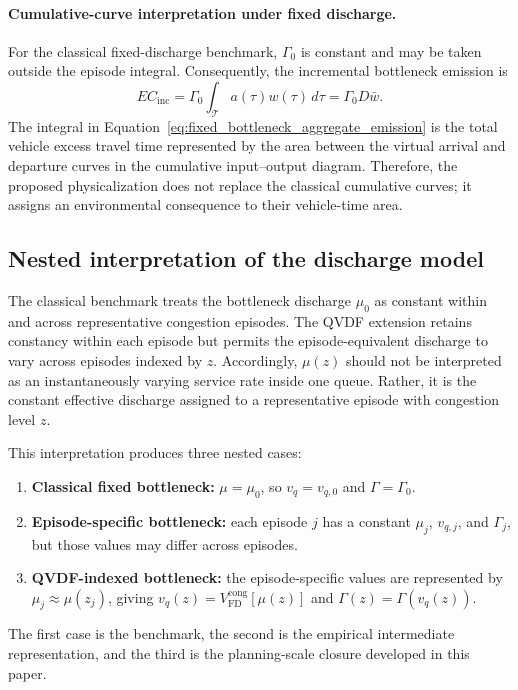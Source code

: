 \paragraph{Cumulative-curve interpretation under fixed discharge.}
For the classical fixed-discharge benchmark, $\Gamma_0$ is constant and may
be taken outside the episode integral. Consequently, the incremental
bottleneck emission is
\begin{equation}
\label{eq:fixed_bottleneck_aggregate_emission}
EC_{\mathrm{inc}}
=
\Gamma_0
\int_{\mathcal T}
a(\tau)w(\tau)\,d\tau
=
\Gamma_0 D\bar w.
\end{equation}
The integral in Equation~\eqref{eq:fixed_bottleneck_aggregate_emission} is the
total vehicle excess travel time represented by the area between the virtual
arrival and departure curves in the cumulative input--output diagram.
Therefore, the proposed physicalization does not replace the classical
cumulative curves; it assigns an environmental consequence to their
vehicle-time area.



\subsection{Nested interpretation of the discharge model}
\label{subsec:nested_discharge}

The classical benchmark treats the bottleneck discharge $\mu_0$ as constant
within and across representative congestion episodes. The QVDF extension
retains constancy within each episode but permits the episode-equivalent
discharge to vary across episodes indexed by $z$. Accordingly,
$\mu(z)$ should not be interpreted as an instantaneously varying service rate
inside one queue. Rather, it is the constant effective discharge assigned to
a representative episode with congestion level $z$.

This interpretation produces three nested cases:
\begin{enumerate}[label=(\alph*),leftmargin=2em]
\item \textbf{Classical fixed bottleneck:}
$\mu=\mu_0$, so $v_q=v_{q,0}$ and $\Gamma=\Gamma_0$.
\item \textbf{Episode-specific bottleneck:}
each episode $j$ has a constant $\mu_j$, $v_{q,j}$, and $\Gamma_j$, but those
values may differ across episodes.
\item \textbf{QVDF-indexed bottleneck:}
the episode-specific values are represented by
$\mu_j\approx\mu(z_j)$, giving
$v_q(z)=V_{\mathrm{FD}}^{\mathrm{cong}}[\mu(z)]$ and
$\Gamma(z)=\Gamma(v_q(z))$.
\end{enumerate}
The first case is the benchmark, the second is the empirical intermediate
representation, and the third is the planning-scale closure developed in
this paper.


